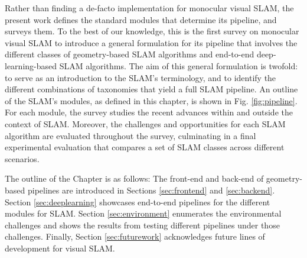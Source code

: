 Rather than finding a de-facto implementation for monocular visual SLAM, the present work defines the standard modules that determine its pipeline, and surveys them. To the best of our knowledge, this is the first survey on monocular visual SLAM to introduce a general formulation for its pipeline that involves the different classes of geometry-based SLAM algorithms and end-to-end deep-learning-based SLAM algorithms. The aim of this general formulation is twofold: to serve as an introduction to the SLAM's terminology, and to identify the different combinations of taxonomies that yield a full SLAM pipeline. An outline of the SLAM's modules, as defined in this chapter, is shown in Fig. \ref{fig:pipeline}. For each module, the survey studies the recent advances within and outside the context of SLAM. Moreover, the challenges and opportunities for each SLAM algorithm are evaluated throughout the survey, culminating in a final experimental evaluation that compares a set of SLAM classes across different scenarios. 

The outline of the Chapter is as follows:
The front-end and back-end of geometry-based pipelines are introduced in Sections \ref{sec:frontend} and \ref{sec:backend}. Section \ref{sec:deeplearning} showcases end-to-end pipelines for the different modules for SLAM. Section \ref{sec:environment} enumerates the environmental challenges and shows the results from testing different pipelines under those challenges. Finally, Section \ref{sec:futurework} acknowledges future lines of development for visual SLAM.







